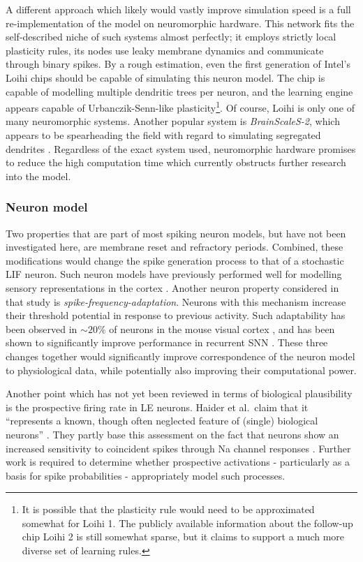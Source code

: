 A different approach which likely would vastly improve simulation speed is a full re-implementation of the model on
neuromorphic hardware. This network fits the self-described niche of such systems almost perfectly; it employs strictly
local plasticity rules, its nodes use leaky membrane dynamics and communicate through binary spikes. By a rough
estimation, even the first generation of Intel's Loihi chips \citep{davies2018loihi} should be capable of simulating
this neuron model. The chip is capable of modelling multiple dendritic trees per neuron, and the learning engine appears
capable of Urbanczik-Senn-like plasticity\footnote{It is possible that the plasticity rule would need to be approximated
somewhat for Loihi 1. The publicly available information about the follow-up chip Loihi 2 \citep{Davies2021} is still
somewhat sparse, but it claims to support a much more diverse set of learning rules.}. Of course, Loihi is only one of
many neuromorphic systems. Another popular system is \textit{BrainScaleS-2}, which appears to be spearheading the field
with regard to simulating segregated dendrites \citep{Kaiser2022}. Regardless of the exact system used, neuromorphic
hardware promises to reduce the high computation time which currently obstructs further research into the model.


\subsubsection*{Neuron model}

Two properties that are part of most spiking neuron models, but have not been investigated here, are membrane reset and
refractory periods. Combined, these modifications would change the spike generation process to that of a stochastic LIF
neuron. Such neuron models have previously performed well for modelling sensory representations in the cortex
\citep{Pillow2008}. Another neuron property considered in that study is \textit{spike-frequency-adaptation}. Neurons
with this mechanism increase their threshold potential in response to previous activity. Such adaptability has been
observed in $\sim 20 \% $ of neurons in the mouse visual cortex \citep{allen2018}, and has been shown to significantly
improve performance in recurrent SNN \citep{bellec2018long,bellec2020solution}. These three changes together would
significantly improve correspondence of the neuron model to physiological data, while potentially also improving their
computational power.

Another point which has not yet been reviewed in terms of biological plausibility is the prospective firing rate in LE
neurons. Haider et al.\ claim that it ``represents a known, though often neglected feature of (single) biological
neurons'' \citep{Haider2021}. They partly base this assessment on the fact that neurons show an increased sensitivity to
coincident spikes through Na channel responses \citep{Platkiewicz2011}. Further work is required to determine whether
prospective activations - particularly as a basis for spike probabilities - appropriately model such processes.  

